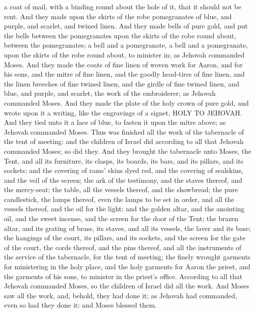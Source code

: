 a coat of mail, with a binding round about the hole of it, that it should not be rent. And they made upon the skirts of the robe pomegranates of blue, and purple, and scarlet, and twined linen. And they made bells of pure gold, and put the bells between the pomegranates upon the skirts of the robe round about, between the pomegranates; a bell and a pomegranate, a bell and a pomegranate, upon the skirts of the robe round about, to minister in; as Jehovah commanded Moses.  And they made the coats of fine linen of woven work for Aaron, and for his sons, and the mitre of fine linen, and the goodly head-tires of fine linen, and the linen breeches of fine twined linen, and the girdle of fine twined linen, and blue, and purple, and scarlet, the work of the embroiderer; as Jehovah commanded Moses.  And they made the plate of the holy crown of pure gold, and wrote upon it a writing, like the engravings of a signet, HOLY TO JEHOVAH. And they tied unto it a lace of blue, to fasten it upon the mitre above; as Jehovah commanded Moses.  Thus was finished all the work of the tabernacle of the tent of meeting: and the children of Israel did according to all that Jehovah commanded Moses; so did they. And they brought the tabernacle unto Moses, the Tent, and all its furniture, its clasps, its boards, its bars, and its pillars, and its sockets; and the covering of rams’ skins dyed red, and the covering of sealskins, and the veil of the screen; the ark of the testimony, and the staves thereof, and the mercy-seat; the table, all the vessels thereof, and the showbread; the pure candlestick, the lamps thereof, even the lamps to be set in order, and all the vessels thereof, and the oil for the light; and the golden altar, and the anointing oil, and the sweet incense, and the screen for the door of the Tent; the brazen altar, and its grating of brass, its staves, and all its vessels, the laver and its base; the hangings of the court, its pillars, and its sockets, and the screen for the gate of the court, the cords thereof, and the pins thereof, and all the instruments of the service of the tabernacle, for the tent of meeting; the finely wrought garments for ministering in the holy place, and the holy garments for Aaron the priest, and the garments of his sons, to minister in the priest’s office. According to all that Jehovah commanded Moses, so the children of Israel did all the work. And Moses saw all the work, and, behold, they had done it; as Jehovah had commanded, even so had they done it: and Moses blessed them. 

